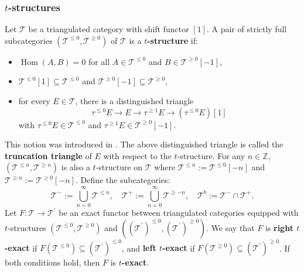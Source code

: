 \documentclass[11pt]{amsart}
\theoremstyle{plain}
\theoremstyle{definition}
\numberwithin{equation}{section}
\numberwithin{theorem}{section}
\begin{document}
\subsubsection{\texorpdfstring{$t$}{t}-structures}
\label{sec:prelim_t-structures_t_structures}

Let $\mathcal{T}$ be a triangulated category with shift functor $[1]$. 
A pair of strictly full subcategories $(\mathcal{T}^{\leq 0}, \mathcal{T}^{\geq 0})$ of $\mathcal{T}$ is a \textbf{$t$-structure} if:
\begin{itemize}
    \item $\operatorname{Hom}(A,B) = 0$ for all $A \in \mathcal{T}^{\leq 0}$ and $B \in \mathcal{T}^{\geq 0}[-1]$,
    \item $\mathcal{T}^{\leq 0}[1] \subseteq \mathcal{T}^{\leq 0}$ and $\mathcal{T}^{\geq 0}[-1] \subseteq \mathcal{T}^{\geq 0}$,
    \item for every $E \in \mathcal{T}$, there is a distinguished triangle
    \begin{displaymath}
        \tau^{\leq 0} E \to E \to \tau^{\geq 1} E \to (\tau^{\leq 0} E)[1]
    \end{displaymath}
    with $\tau^{\leq 0} E \in \mathcal{T}^{\leq 0}$ and $\tau^{\geq 1} E \in \mathcal{T}^{\geq 0}[-1]$.
\end{itemize}
This notion was introduced in \cite{Beilinson/Berstein/Deligne/Gabber:2018}. 
The above distinguished triangle is called the \textbf{truncation triangle} of $E$ with respect to the $t$-structure. 
For any $n \in \mathbb{Z}$, $(\mathcal{T}^{\leq n}, \mathcal{T}^{\geq n})$ is also a $t$-structure on $\mathcal{T}$ where $\mathcal{T}^{\leq n} := \mathcal{T}^{\leq 0}[-n]$ and $\mathcal{T}^{\geq n} := \mathcal{T}^{\geq 0}[-n]$. 
Define the subcategories:
\begin{displaymath}
    \mathcal{T}^{-}:= \bigcup_{n=0}^\infty \mathcal{T}^{\leq n},\quad \mathcal{T}^{+} := \bigcup^\infty_{n=0} \mathcal{T}^{\geq -n},\quad \mathcal{T}^b := \mathcal{T}^{-} \cap \mathcal{T}^{+}.
\end{displaymath}
Let $F \colon \mathcal{T} \to \mathcal{T}^\prime$ be an exact functor between triangulated categories equipped with $t$-structures $(\mathcal{T}^{\leq 0}, \mathcal{T}^{\geq 0})$ and $((\mathcal{T}^\prime)^{\leq 0}, (\mathcal{T}^\prime)^{\geq 0})$. 
We say that $F$ is \textbf{right $t$-exact} if $
F(\mathcal{T}^{\leq 0}) \subseteq (\mathcal{T}^\prime)^{\leq 0}$,
and \textbf{left $t$-exact} if 
$F(\mathcal{T}^{\geq 0}) \subseteq (\mathcal{T}^\prime)^{\geq 0}$. 
If both conditions hold, then $F$ is \textbf{$t$-exact}.
\end{document}
